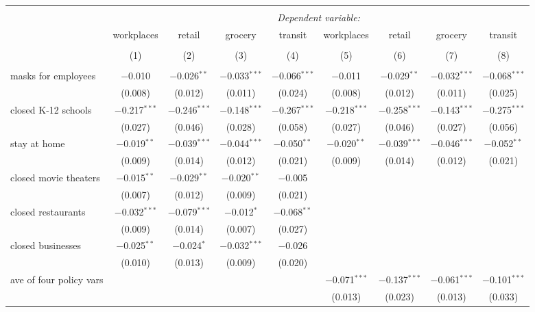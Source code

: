 \begin{tabular}{@{\extracolsep{1pt}}lcccccccc} 
\\[-1.8ex]\hline 
\hline \\[-1.8ex] 
 & \multicolumn{8}{c}{\textit{Dependent variable:}} \\ 
\cline{2-9} 
 & workplaces & retail & grocery & transit & workplaces & retail & grocery & transit \\ 
\\[-1.8ex] & (1) & (2) & (3) & (4) & (5) & (6) & (7) & (8)\\ 
\hline \\[-1.8ex] 
 masks for employees & $-$0.010 & $-$0.026$^{**}$ & $-$0.033$^{***}$ & $-$0.066$^{***}$ & $-$0.011 & $-$0.029$^{**}$ & $-$0.032$^{***}$ & $-$0.068$^{***}$ \\ 
  & (0.008) & (0.012) & (0.011) & (0.024) & (0.008) & (0.012) & (0.011) & (0.025) \\ 
  closed K-12 schools & $-$0.217$^{***}$ & $-$0.246$^{***}$ & $-$0.148$^{***}$ & $-$0.267$^{***}$ & $-$0.218$^{***}$ & $-$0.258$^{***}$ & $-$0.143$^{***}$ & $-$0.275$^{***}$ \\ 
  & (0.027) & (0.046) & (0.028) & (0.058) & (0.027) & (0.046) & (0.027) & (0.056) \\ 
  stay at home & $-$0.019$^{**}$ & $-$0.039$^{***}$ & $-$0.044$^{***}$ & $-$0.050$^{**}$ & $-$0.020$^{**}$ & $-$0.039$^{***}$ & $-$0.046$^{***}$ & $-$0.052$^{**}$ \\ 
  & (0.009) & (0.014) & (0.012) & (0.021) & (0.009) & (0.014) & (0.012) & (0.021) \\ 
  closed movie theaters & $-$0.015$^{**}$ & $-$0.029$^{**}$ & $-$0.020$^{**}$ & $-$0.005 &  &  &  &  \\ 
  & (0.007) & (0.012) & (0.009) & (0.021) &  &  &  &  \\ 
  closed restaurants & $-$0.032$^{***}$ & $-$0.079$^{***}$ & $-$0.012$^{*}$ & $-$0.068$^{**}$ &  &  &  &  \\ 
  & (0.009) & (0.014) & (0.007) & (0.027) &  &  &  &  \\ 
  closed businesses & $-$0.025$^{**}$ & $-$0.024$^{*}$ & $-$0.032$^{***}$ & $-$0.026 &  &  &  &  \\ 
  & (0.010) & (0.013) & (0.009) & (0.020) &  &  &  &  \\ 
  ave of four policy vars &  &  &  &  & $-$0.071$^{***}$ & $-$0.137$^{***}$ & $-$0.061$^{***}$ & $-$0.101$^{***}$ \\ 
  &  &  &  &  & (0.013) & (0.023) & (0.013) & (0.033) \\ 

\end{tabular}
